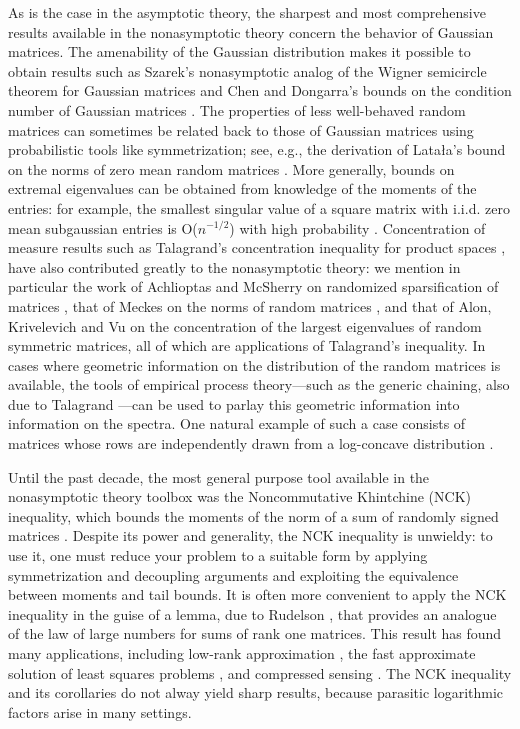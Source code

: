 \documentclass[11pt,letterpaper,twoside,reqno,nosumlimits]{amsart}
\theoremstyle{remark}
\numberwithin{equation}{section}
\numberwithin{thm}{section}
\numberwithin{prop}{section}
\numberwithin{defn}{section}
\numberwithin{remark}{section}
\begin{document}
As is the case in the asymptotic theory, the sharpest and most comprehensive results available in the nonasymptotic theory concern the behavior of Gaussian matrices. The amenability of the Gaussian distribution makes it possible to obtain results such as Szarek's nonasymptotic analog of the Wigner semicircle theorem for Gaussian matrices \cite{Sza90} and Chen and Dongarra's bounds on the condition number of Gaussian matrices \cite{ChenDongarra05}.
The properties of less well-behaved random matrices can sometimes be related back to those of Gaussian matrices using probabilistic tools like symmetrization; see, e.g., the derivation of Lata{\l}a's bound on the norms of zero mean random matrices \cite{Lat04}. More generally, bounds on extremal eigenvalues can be obtained from knowledge of the moments of the entries: for example, the smallest singular value of a square matrix with i.i.d. zero mean subgaussian entries is O($n^{-1/2}$) with high probability \cite{RV08}. Concentration of measure results such as Talagrand's concentration inequality for product spaces \cite{Talagrand95}, have also contributed greatly to the nonasymptotic theory: we mention in particular the work of Achlioptas and McSherry on randomized sparsification of matrices \cite{AM01,AM07}, that of Meckes on the norms of random matrices \cite{Meckes04}, and that of Alon, Krivelevich and Vu \cite{AlonKrivelevichVu02} on the concentration of the largest eigenvalues of random symmetric matrices, all of which are applications of Talagrand's inequality. In cases where geometric information on the distribution of the random matrices is available, the tools of empirical process theory---such as the generic chaining, also due to Talagrand \cite{Talagrand05}---can be used to parlay this geometric information into information on the spectra. One natural example of such a case consists of matrices whose rows are independently drawn from a log-concave distribution \cite{MendelsonPajor06,ALPT10b}.

Until the past decade, the most general purpose tool available in the nonasymptotic theory toolbox was the Noncommutative Khintchine (NCK) inequality, which bounds the moments of the norm of a sum of randomly signed matrices \cite{Lust-PiquardPisier91}. Despite its power and generality, the NCK inequality is unwieldy: to use it, one must reduce your problem to a suitable form by applying symmetrization and decoupling arguments and exploiting the equivalence between moments and tail bounds. It is often more convenient to apply the NCK inequality in the guise of a lemma, due to Rudelson \cite{RU99}, that provides an analogue of the law of large numbers for sums of rank one matrices. This result has found many applications, including low-rank approximation \cite{RV07}, the fast approximate solution of least squares problems \cite{DMMS11}, and compressed sensing \cite{CandesRomberg07}. The NCK inequality and its corollaries do not alway yield sharp results, because parasitic logarithmic factors arise in many settings.
\end{document}
